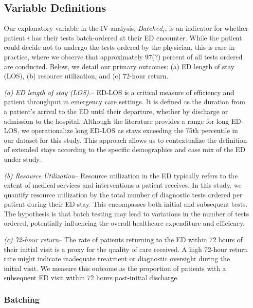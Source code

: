 \documentclass[,,nonblindrev]{informs}
\begin{document}
\hypertarget{variable-definitions}{%
\subsection{Variable Definitions}\label{variable-definitions}}

Our explanatory variable in the IV analysis, \(Batched_i\), is an
indicator for whether patient \(i\) has their tests batch-ordered at
their ED encounter. While the patient could decide not to undergo the
tests ordered by the physician, this is rare in practice, where we
observe that approximately 97(?) percent of all tests ordered are
conducted. Below, we detail our primary outcomes: (a) ED length of stay
(LOS), (b) resource utilization, and (c) 72-hour return.

\emph{(a) ED length of stay (LOS).}-- ED-LOS is a critical measure of
efficiency and patient throughput in emergency care settings. It is
defined as the duration from a patient's arrival to the ED until their
departure, whether by discharge or admission to the hospital. Although
the literature provides a range for long ED-LOS, we operationalize long
ED-LOS as stays exceeding the 75th percentile in our dataset for this
study. This approach allows us to contextualize the definition of
extended stays according to the specific demographics and case mix of
the ED under study.

\emph{(b) Resource Utilization}-- Resource utilization in the ED
typically refers to the extent of medical services and interventions a
patient receives. In this study, we quantify resource utilization by the
total number of diagnostic tests ordered per patient during their ED
stay. This encompasses both initial and subsequent tests. The hypothesis
is that batch testing may lead to variations in the number of tests
ordered, potentially influencing the overall healthcare expenditure and
efficiency.

\emph{(c) 72-hour return}-- The rate of patients returning to the ED
within 72 hours of their initial visit is a proxy for the quality of
care received. A high 72-hour return rate might indicate inadequate
treatment or diagnostic oversight during the initial visit. We measure
this outcome as the proportion of patients with a subsequent ED visit
within 72 hours post-initial discharge.

\hypertarget{batching}{%
\subsubsection{Batching}\label{batching}}
\end{document}
